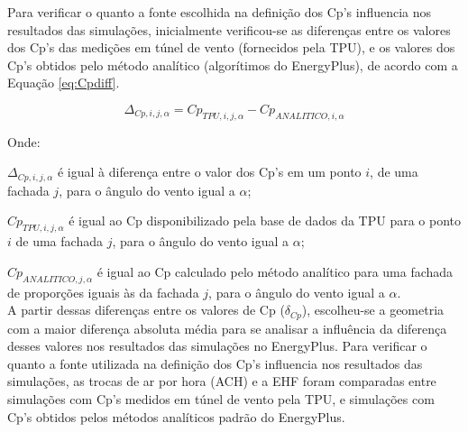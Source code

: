 \documentclass[brazil,hardcopy,openany,a5paper]{ufscthesis}
\begin{document}
		Para verificar o quanto a fonte escolhida na definição dos Cp's influencia nos resultados das simulações, inicialmente verificou-se as diferenças entre os valores dos Cp's das medições em túnel de vento (fornecidos pela TPU), e os valores dos Cp's obtidos pelo método analítico (algorítimos do EnergyPlus), de acordo com a Equação \ref{eq:Cpdiff}.
		
		\begin{equation}
		\label{eq:Cpdiff}
		\Delta_{Cp,i,j,\alpha} = Cp_{TPU,i,j,\alpha} - Cp_{ANALITICO,i,\alpha}
		\end{equation}
		
		Onde:
		
		$\Delta_{Cp,i,j,\alpha}$ é igual à diferença entre o valor dos Cp's em um ponto $i$, de uma fachada $j$, para o ângulo do vento igual a $\alpha$;
		
		$Cp_{TPU,i,j,\alpha}$ é igual ao Cp disponibilizado pela base de dados da TPU para o ponto $i$ de uma fachada $j$, para o ângulo do vento igual a $\alpha$;
		
		$Cp_{ANALITICO,j,\alpha}$ é igual ao Cp calculado pelo método analítico para uma fachada de proporções iguais às da fachada $j$, para o ângulo do vento igual a $\alpha$.
		\\
		

		A partir dessas diferenças entre os valores de Cp ($\delta_{Cp}$), escolheu-se a geometria com a maior diferença absoluta média para se analisar a influência da diferença desses valores nos resultados das simulações no EnergyPlus.
		Para verificar o quanto a fonte utilizada na definição dos Cp's influencia nos resultados das simulações, as trocas de ar por hora (ACH) e a EHF foram comparadas entre simulações com Cp's medidos em túnel de vento pela TPU, e simulações com Cp's obtidos pelos métodos analíticos padrão do EnergyPlus.
				
%		
		
\end{document}
